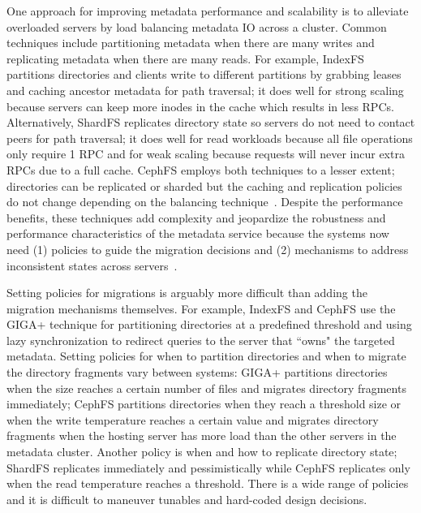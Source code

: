 One approach for improving metadata performance and scalability is to alleviate
overloaded servers by load balancing metadata IO across a cluster. Common
techniques include partitioning metadata when there are many writes and
replicating metadata when there are many reads. For example, IndexFS partitions
directories and clients write to different partitions by grabbing leases and
caching ancestor metadata for path traversal; it does well for strong scaling
because servers can keep more inodes in the cache which results in less RPCs.
Alternatively, ShardFS replicates directory state so servers do not need to
contact peers for path traversal; it does well for read workloads because all
file operations only require 1 RPC and for weak scaling because requests will
never incur extra RPCs due to a full cache.  CephFS employs both techniques to
a lesser extent; directories can be replicated or sharded but the caching and
replication policies do not change depending on the balancing
technique~\cite{weil:sc2004-dyn-metadata, weil:phdthesis07}.  Despite the
performance benefits, these techniques add complexity and jeopardize the
robustness and performance characteristics of the metadata service because the
systems now need (1) policies to guide the migration decisions and (2)
mechanisms to address inconsistent states across
servers~\cite{sevilla:sc15-mantle}.

Setting policies for migrations is arguably more difficult than adding the
migration mechanisms themselves.  For example, IndexFS and CephFS use the GIGA+
technique for partitioning directories at a predefined threshold and using lazy
synchronization to redirect queries to the server that ``owns" the targeted
metadata.  Setting policies for when to partition directories and when to
migrate the directory fragments vary between systems: GIGA+ partitions
directories when the size reaches a certain number of files and migrates
directory fragments immediately; CephFS partitions directories when they reach
a threshold size or when the write temperature reaches a certain value and
migrates directory fragments when the hosting server has more load than the
other servers in the metadata cluster. Another policy is when and how to
replicate directory state; ShardFS replicates immediately and pessimistically
while CephFS replicates only when the read temperature reaches a threshold.
There is a wide range of policies and it is difficult to maneuver tunables and
hard-coded design decisions.

